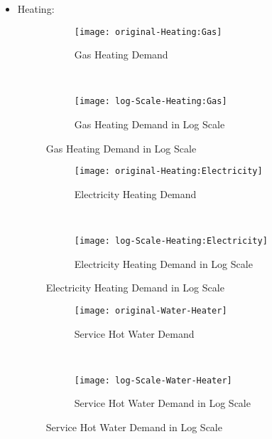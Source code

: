 \begin{itemize}
\item Heating:

\begin{figure}[h!]
  \centering
  \begin{subfigure}{0.4\textwidth}
  \centering
  \texttt{[image: original-Heating:Gas]}
  \caption[Gas Heating Demand]{Gas Heating Demand}
  \label{fig:original-Heating:Gas}
\end{subfigure}
~
\begin{subfigure}{0.4\textwidth}
  \centering
  \texttt{[image: log-Scale-Heating:Gas]}
  \caption[Gas Heating Demand]{Gas Heating Demand in Log Scale}
  \label{fig:log-Scale-Heating:Gas}
\end{subfigure}
  \caption[Gas Heating Demand Log]{Gas Heating Demand in Log Scale}
\end{figure}

\begin{figure}[h!]
  \centering
  \begin{subfigure}{0.4\textwidth}
  \centering
  \texttt{[image: original-Heating:Electricity]}
  \caption[Electricity Heating Demand]{Electricity Heating Demand}
  \label{fig:original-Heating:Electricity}
\end{subfigure}
~
\begin{subfigure}{0.4\textwidth}
  \centering
  \texttt{[image: log-Scale-Heating:Electricity]}
  \caption[Electricity Heating Demand]{Electricity Heating Demand in Log Scale}
  \label{fig:log-Scale-Heating:Electricity}
\end{subfigure}
  \caption[Electricity Heating Demand Log]{Electricity Heating Demand in Log Scale}
\end{figure}

\begin{figure}[h!]
  \centering
  \begin{subfigure}{0.4\textwidth}
  \centering
  \texttt{[image: original-Water-Heater]}
  \caption[Service Hot Water Demand]{Service Hot Water Demand}
  \label{fig:original-Water Heater}
\end{subfigure}
~
\begin{subfigure}{0.4\textwidth}
  \centering
  \texttt{[image: log-Scale-Water-Heater]}
  \caption[Service Hot Water Demand]{Service Hot Water Demand in Log Scale}
  \label{fig:log-Scale-Water-Heater}
\end{subfigure}
  \caption[Service Hot Water Demand Log]{Service Hot Water Demand in Log Scale}
\end{figure}


\end{itemize}
